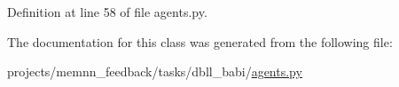 Definition at line 58 of file agents.\+py.



The documentation for this class was generated from the following file\+:\begin{DoxyCompactItemize}
\item 
projects/memnn\+\_\+feedback/tasks/dbll\+\_\+babi/\hyperlink{projects_2memnn__feedback_2tasks_2dbll__babi_2agents_8py}{agents.\+py}\end{DoxyCompactItemize}
